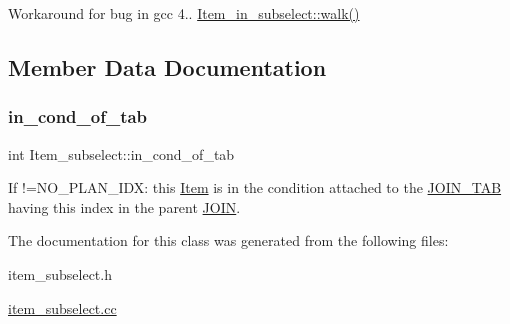 Workaround for bug in gcc 4..  \mbox{\hyperlink{classItem__in__subselect_ae2d9db307c8214b314f387b8f0fca6ae}{Item\+\_\+in\+\_\+subselect\+::walk()}} 

\subsection{Member Data Documentation}
\mbox{\label{classItem__subselect_a844742f0868e1938f275be3195665a84}} 
\subsubsection{\texorpdfstring{in\+\_\+cond\+\_\+of\+\_\+tab}{in\_cond\_of\_tab}}
{\footnotesize\ttfamily int Item\+\_\+subselect\+::in\+\_\+cond\+\_\+of\+\_\+tab}

If !=N\+O\+\_\+\+P\+L\+A\+N\+\_\+\+I\+DX\+: this \mbox{\hyperlink{classItem}{Item}} is in the condition attached to the \mbox{\hyperlink{classJOIN__TAB}{J\+O\+I\+N\+\_\+\+T\+AB}} having this index in the parent \mbox{\hyperlink{classJOIN}{J\+O\+IN}}. 

The documentation for this class was generated from the following files\+:\begin{DoxyCompactItemize}
\item 
item\+\_\+subselect.\+h\item 
\mbox{\hyperlink{item__subselect_8cc}{item\+\_\+subselect.\+cc}}\end{DoxyCompactItemize}
